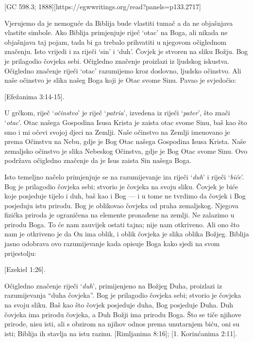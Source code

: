 [GC 598.3; 1888][https://egwwritings.org/read?panels=p133.2717]

Vjerujemo da je nemoguće da Biblija bude vlastiti tumač a da ne objašnjava vlastite simbole. Ako Biblija primjenjuje riječ ‘otac’ na Boga, ali nikada ne objašnjava taj pojam, tada bi ga trebalo prihvatiti u njegovom očiglednom značenju. Isto vrijedi i za riječi ‘sin’ i ‘duh’. Čovjek je stvoren na sliku Božju. Bog je prilagodio čovjeka sebi. Očigledno značenje proizlazi iz ljudskog iskustva. Očigledno značenje riječi ‘otac’ razumijemo kroz doslovno, ljudsko očinstvo. Ali naše očinstvo je slika našeg Boga koji je Otac svome Sinu. Pavao je svjedočio:

[Efežanima 3:14-15].

U grčkom, riječ ‘\textit{očinstvo}’ je riječ ‘\textit{patria}’, izvedena iz riječi ‘\textit{pater}’, što znači ‘\textit{otac}’. Otac našega Gospodina Isusa Krista je zaista otac svome Sinu, baš kao što smo i mi očevi svojoj djeci na Zemlji. Naše očinstvo na Zemlji imenovano je prema Očinstvu na Nebu, gdje je Bog Otac našega Gospodina Isusa Krista. Naše zemaljsko očinstvo je slika Nebeskog Očinstva, gdje je Bog Otac svome Sinu. Ovo podržava očigledno značenje da je Isus zaista Sin našega Boga.

Isto temeljno načelo primjenjuje se na razumijevanje iza riječi ‘\textit{duh}’ i riječi ‘\textit{biće}’. Bog je prilagodio čovjeka sebi; stvorio je čovjeka na svoju sliku. Čovjek je biće koje posjeduje tijelo i duh, baš kao i Bog — i u tome ne tvrdimo da čovjek i Bog posjeduju istu prirodu. Bog je oblikovao čovjeka od praha zemaljskog. Njegova fizička priroda je ograničena na elemente pronađene na zemlji. Ne zalazimo u prirodu Boga. To će nam zauvijek ostati tajna; nije nam otkriveno. Ali ono što nam je otkriveno je da On ima oblik, i oblik čovjeka je slika oblika Božjeg. Biblija jasno odobrava ovo razumijevanje kada opisuje Boga kako sjedi na svom prijestolju:

[Ezekiel 1:26].

Očigledno značenje riječi ‘\textit{duh}’, primijenjeno na Božjeg Duha, proizlazi iz razumijevanja “duha čovjeka”. Bog je prilagodio čovjeka sebi; stvorio je čovjeka na svoju sliku. Baš kao što čovjek posjeduje duha, Bog posjeduje Duha. Duh čovjeka ima prirodu čovjeka, a Duh Božji ima prirodu Boga. Što se tiče njihove prirode, nisu isti, ali s obzirom na njihov odnos prema unutarnjem biću, oni su isti; Biblija ih stavlja na istu razinu. [Rimljanima 8:16]; [1. Korinćanima 2:11].

